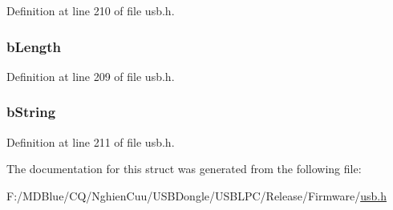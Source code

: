 Definition at line 210 of file usb.h.

\hypertarget{struct___u_s_b___s_t_r_i_n_g___d_e_s_c_r_i_p_t_o_r_a8e443464272fdf3bd5148df0b7f5dcaf}{
\subsubsection[{bLength}]{ {\bf bLength}}}
\label{struct___u_s_b___s_t_r_i_n_g___d_e_s_c_r_i_p_t_o_r_a8e443464272fdf3bd5148df0b7f5dcaf}


Definition at line 209 of file usb.h.

\hypertarget{struct___u_s_b___s_t_r_i_n_g___d_e_s_c_r_i_p_t_o_r_a95218d59dc2cad19d16fa6f721222be9}{
\subsubsection[{bString}]{ {\bf bString}}}
\label{struct___u_s_b___s_t_r_i_n_g___d_e_s_c_r_i_p_t_o_r_a95218d59dc2cad19d16fa6f721222be9}


Definition at line 211 of file usb.h.



The documentation for this struct was generated from the following file:\begin{DoxyCompactItemize}
\item 
F:/MDBlue/CQ/NghienCuu/USBDongle/USBLPC/Release/Firmware/\hyperlink{usb_8h}{usb.h}\end{DoxyCompactItemize}
